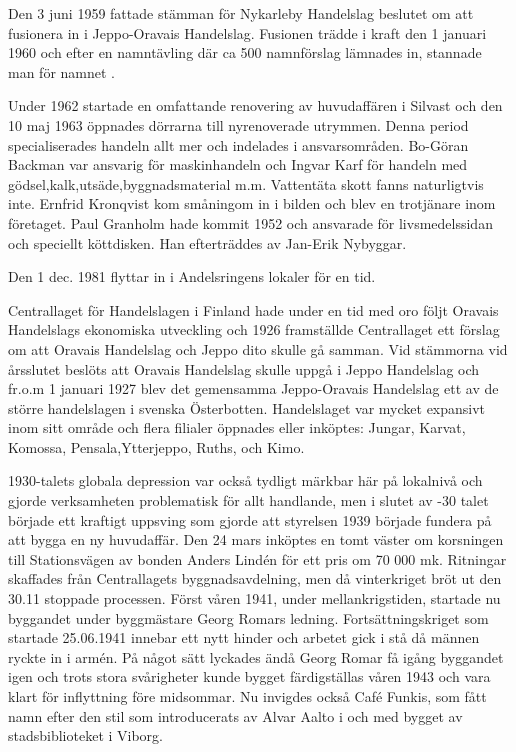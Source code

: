%
Den 3 juni 1959 fattade stämman för Nykarleby Handelslag  beslutet om att fusionera in i Jeppo-Oravais Handelslag. Fusionen trädde i kraft den 1 januari 1960 och efter en namntävling där ca 500 namnförslag lämnades in, stannade man för namnet .


Under 1962 startade en omfattande renovering av huvudaffären i Silvast och den 10 maj 1963 öppnades dörrarna till nyrenoverade utrymmen. Denna period specialiserades handeln allt mer och indelades i ansvarsområden. Bo-Göran Backman var ansvarig för maskinhandeln och Ingvar Karf för handeln med gödsel,kalk,utsäde,byggnadsmaterial m.m. Vattentäta skott fanns naturligtvis inte. Ernfrid Kronqvist kom småningom in i bilden och blev en trotjänare inom företaget. Paul Granholm hade kommit 1952 och ansvarade för livsmedelssidan och speciellt köttdisken. Han efterträddes av Jan-Erik Nybyggar.

Den 1 dec. 1981 flyttar  in i Andelsringens lokaler för en tid.



%
Centrallaget för Handelslagen i Finland hade under en tid med oro följt Oravais Handelslags ekonomiska utveckling och 1926 framställde Centrallaget ett förslag om att Oravais Handelslag och Jeppo dito skulle gå samman. Vid stämmorna vid årsslutet beslöts att Oravais Handelslag skulle uppgå i Jeppo Handelslag och fr.o.m 1 januari 1927 blev det gemensamma Jeppo-Oravais Handelslag ett av de större handelslagen i svenska Österbotten. Handelslaget var mycket expansivt inom sitt område och flera filialer öppnades eller inköptes: Jungar, Karvat, Komossa, Pensala,Ytterjeppo, Ruths, och Kimo.


1930-talets globala depression var också tydligt märkbar här på lokalnivå och gjorde verksamheten problematisk för allt handlande, men i slutet av -30 talet började ett kraftigt uppsving som gjorde att styrelsen 1939 började fundera på att bygga en ny huvudaffär. Den 24 mars inköptes en tomt väster om korsningen till Stationsvägen av bonden Anders Lindén för ett pris om 70 000 mk. Ritningar skaffades från Centrallagets byggnadsavdelning, men då vinterkriget bröt ut den 30.11 stoppade processen. Först våren 1941, under mellankrigstiden, startade nu byggandet under byggmästare Georg Romars ledning. Fortsättningskriget som startade 25.06.1941 innebar ett nytt hinder och arbetet gick i stå då männen ryckte in i armén. På något sätt lyckades ändå Georg Romar få igång byggandet igen och trots stora svårigheter kunde bygget färdigställas våren 1943 och vara klart för inflyttning före midsommar. Nu invigdes också Café Funkis, som fått namn efter den stil som introducerats av Alvar Aalto i och med bygget av stadsbiblioteket i Viborg.

